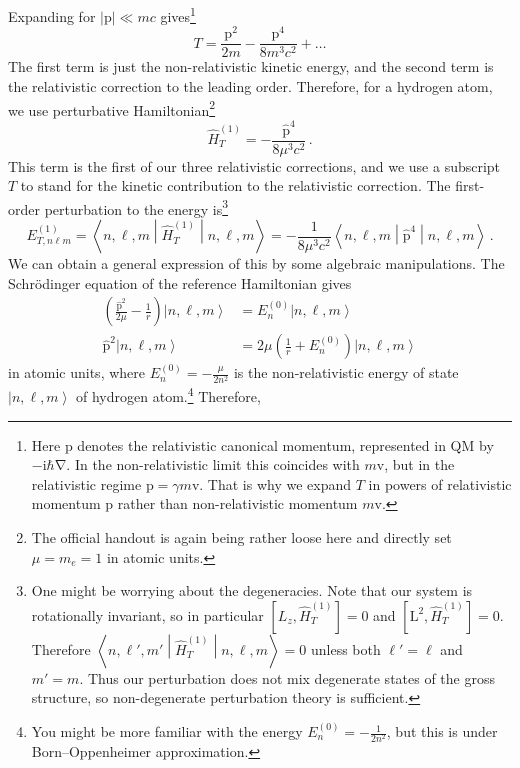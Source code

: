 \documentclass{article}
\theoremstyle{plain}\theoremheaderfont{\normalfont\itshape}\theorembodyfont{\rmfamily}\theoremseparator{.}\newtheorem*{rem}{Remark}\newtheorem*{ex}{Example}\newtheorem*{proof}{Proof}\newtheorem*{altp}{Alternative proof}
\theoremstyle{plain}\theoremheaderfont{\normalfont\bfseries}\theorembodyfont{\rmfamily}\theoremseparator{.}\newtheorem{thm}{Theorem}[section]\newtheorem{lem}[thm]{Lemma}\newtheorem{prop}[thm]{Proposition}\newtheorem*{cor}{Corollary}\newtheorem{defn}[thm]{Definition}\newtheorem{clm}[thm]{Claim}\newtheorem{clminproof}{Claim}
\theoremstyle{break}\theoremheaderfont{\normalfont\itshape}\theorembodyfont{\rmfamily}\theoremseparator{.\medskip}\newtheorem*{proofskip}{Proof}\newtheorem*{exs}{Examples}\newtheorem*{rems}{Remarks}
\theoremstyle{break}\theoremheaderfont{\normalfont\bfseries}\theorembodyfont{\rmfamily}\theoremseparator{.\medskip}\newtheorem{lemskip}[thm]{Lemma}\newtheorem{defnskip}[thm]{Definition}\newtheorem{propskip}[thm]{Proposition}\newtheorem{thmskip}[thm]{Theorem}
\numberwithin{equation}{section}
\newcommand{\ii}{\mathrm{i}}
\newcommand{\ket}[1]{\left| #1 \right\rangle}
\newcommand{\mel}[3]{\left\langle #1 \middle| #2 \middle| #3 \right\rangle}
\newcommand{\expval}[2]{\left\langle #2 \middle| #1 \middle| #2 \right\rangle}
\newcommand{\vb}[1]{\bm{\mathrm{#1}}}
\newcommand{\abs}[1]{\left| #1 \right|}
\newcommand{\grad}{\vb{\nabla}}
\begin{document}
    Expanding for \(\abs{\vb{p}}\ll mc\) gives\footnote{Here \(\vb{p}\) denotes the relativistic canonical momentum, represented in QM by \(-\ii\hbar\grad\). In the non-relativistic limit this coincides with \(m\vb{v}\), but in the relativistic regime \(\vb{p}=\gamma m\vb{v}\). That is why we expand \(T\) in powers of relativistic momentum \(\vb{p}\) rather than non-relativistic momentum \(m\vb{v}\).}
    \begin{equation}
        T=\frac{\vb{p}^2}{2m}-\frac{\vb{p}^4}{8m^3 c^2}+\dots
    \end{equation}
    The first term is just the non-relativistic kinetic energy, and the second term is the relativistic correction to the leading order. Therefore, for a hydrogen atom, we use perturbative Hamiltonian\footnote{The official handout is again being rather loose here and directly set \(\mu=m_e=1\) in atomic units.}
    \begin{equation}
        \hat{H}_{T}^{(1)}=-\frac{\hat{\vb{p}}^4}{8\mu^3 c^2}\,.
    \end{equation}
    This term is the first of our three relativistic corrections, and we use a subscript \(T\) to stand for the kinetic contribution to the relativistic correction. The first-order perturbation to the energy is\footnote{One might be worrying about the degeneracies. Note that our system is rotationally invariant, so in particular \([L_z,\hat{H}_{T}^{(1)}]=0\) and \([\vb{L}^2,\hat{H}_{T}^{(1)}]=0\). Therefore \(\mel{n,\ell',m'}{\hat{H}_{T}^{(1)}}{n,\ell,m}=0\) unless both \(\ell'=\ell\) and \(m'=m\). Thus our perturbation does not mix degenerate states of the gross structure, so non-degenerate perturbation theory is sufficient.}
    \begin{equation}
        E_{T,n\ell m}^{(1)}=\expval{\hat{H}_T^{(1)}}{n,\ell,m}=-\frac{1}{8\mu^3 c^2}\expval{\hat{\vb{p}}^4}{n,\ell,m}\,.
    \end{equation}
    We can obtain a general expression of this by some algebraic manipulations. The Schr\"{o}dinger equation of the reference Hamiltonian gives
    \begin{align}
        \left(\frac{\hat{\vb{p}}^2}{2\mu}-\frac{1}{r}\right)\ket{n,\ell,m}&=E_n^{(0)}\ket{n,\ell,m}\\
        \hat{\vb{p}}^2\ket{n,\ell,m}&=2\mu\left(\frac{1}{r}+E_n^{(0)}\right)\ket{n,\ell,m}
    \end{align}
    in atomic units, where \(E_n^{(0)}=-\frac{\mu}{2n^2}\) is the non-relativistic energy of state \(\ket{n,\ell,m}\) of hydrogen atom.\footnote{You might be more familiar with the energy \(E_n^{(0)}=-\frac{1}{2n^2}\), but this is under Born--Oppenheimer approximation.} Therefore,
\end{document}
